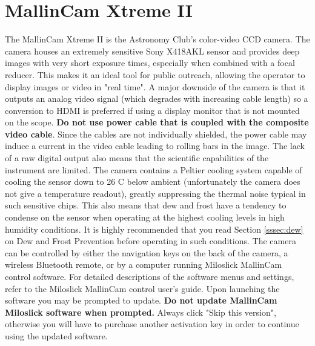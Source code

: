 \documentclass[12pt,titlepage]{article}
\begin{document}
\section{MallinCam Xtreme II}
The MallinCam Xtreme II is the Astronomy Club's color-video CCD camera.
The camera houses an extremely sensitive Sony X418AKL sensor and provides deep images with very short exposure times, especially when combined with a focal reducer.
This makes it an ideal tool for public outreach, allowing the operator to display images or video in "real time".
A major downside of the camera is that it outputs an analog video signal (which degrades with increasing cable length) so a conversion to HDMI is preferred if using a display monitor that is not mounted on the scope.
\textbf{Do not use power cable that is coupled with the composite video cable}.
Since the cables are not individually shielded, the power cable may induce a current in the video cable leading to rolling bars in the image.
The lack of a raw digital output also means that the scientific capabilities of the instrument are limited.
The camera contains a Peltier cooling system capable of cooling the sensor down to 26 C below ambient (unfortunately the camera does not give a temperature readout), greatly suppressing the thermal noise typical in such sensitive chips.
This also means that dew and frost have a tendency to condense on the sensor when operating at the highest cooling levels in high humidity conditions.
It is highly recommended that you read Section \ref{sssec:dew} on Dew and Frost Prevention before operating in such conditions.
The camera can be controlled by either the navigation keys on the back of the camera, a wireless Bluetooth remote, or by a computer running Miloslick MallinCam control software.
For detailed descriptions of the software menus and settings, refer to the Miloslick MallinCam control user's guide\cite{miloslick}.
Upon launching the software you may be prompted to update.
\textbf{Do not update MallinCam Miloslick software when prompted.}
Always click "Skip this version", otherwise you will have to purchase another activation key in order to continue using the updated software.
\end{document}
